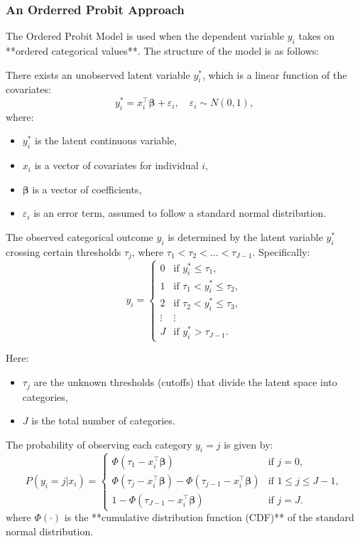 \subsubsection{An Orderred Probit Approach}
The Ordered Probit Model is used when the dependent variable \( y_i \) takes on **ordered categorical values**. The structure of the model is as follows:

There exists an unobserved latent variable \( y_i^* \), which is a linear function of the covariates:
\[
y_i^* = x_i^\top \bm{\beta} + \varepsilon_i, \quad \varepsilon_i \sim N(0, 1),
\]
where:
\begin{itemize}
    \item \( y_i^* \) is the latent continuous variable,
    \item \( x_i \) is a vector of covariates for individual \( i \),
    \item \( \bm{\beta} \) is a vector of coefficients,
    \item \( \varepsilon_i \) is an error term, assumed to follow a standard normal distribution.
\end{itemize}

The observed categorical outcome \( y_i \) is determined by the latent variable \( y_i^* \) crossing certain thresholds \( \tau_j \), where \( \tau_1 < \tau_2 < \dots < \tau_{J-1} \). Specifically:
\[
y_i =
\begin{cases}
0 & \text{if } y_i^* \leq \tau_1, \\
1 & \text{if } \tau_1 < y_i^* \leq \tau_2, \\
2 & \text{if } \tau_2 < y_i^* \leq \tau_3, \\
\vdots & \vdots \\
J & \text{if } y_i^* > \tau_{J-1}.
\end{cases}
\]

Here:
\begin{itemize}
    \item \( \tau_j \) are the unknown thresholds (cutoffs) that divide the latent space into categories,
    \item \( J \) is the total number of categories.
\end{itemize}

The probability of observing each category \( y_i = j \) is given by:
\[
P(y_i = j | x_i) =
\begin{cases}
\Phi(\tau_1 - x_i^\top \bm{\beta}) & \text{if } j = 0, \\
\Phi(\tau_j - x_i^\top \bm{\beta}) - \Phi(\tau_{j-1} - x_i^\top \bm{\beta}) & \text{if } 1 \leq j \leq J-1, \\
1 - \Phi(\tau_{J-1} - x_i^\top \bm{\beta}) & \text{if } j = J.
\end{cases}
\]
where \( \Phi(\cdot) \) is the **cumulative distribution function (CDF)** of the standard normal distribution.

